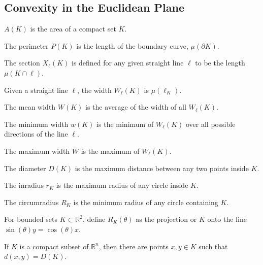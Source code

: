     \subsection{Convexity in the Euclidean Plane}
        \begin{definition}
        $A(K)$ is the area of a compact set $K$.
        \end{definition}
        \begin{definition}
        The perimeter $P(K)$ is the length of the boundary curve, $\mu(\partial K)$.
        \end{definition}
        \begin{definition}
        The section $X_{\ell}(K)$ is defined for any given straight line $\ell$ to be the length $\mu(K\cap \ell)$.
        \end{definition}
        \begin{definition}
        Given a straight line $\ell$, the width $W_{\ell}(K)$ is $\mu(\ell_{K})$.
        \end{definition}
        \begin{definition}
        The mean width $W(K)$ is the average of the width of all $W_{\ell}(K)$.
        \end{definition}
        \begin{definition}
        The minimum width $w(K)$ is the minimum of $W_{\ell}(K)$ over all possible directions of the line $\ell$.
        \end{definition}
        \begin{definition}
        The maximum width $\check{W}$ is the maximum of $W_{\ell}(K)$.
        \end{definition}
        \begin{definition}
        The diameter $D(K)$ is the maximum distance between any two points inside $K$.
        \end{definition}
        \begin{definition}
        The inradius $r_K$ is the maximum radius of any circle inside $K$.
        \end{definition}
        \begin{definition}
        The circumradius $R_K$ is the minimum radius of any circle containing $K$.
        \end{definition}
        For bounded sets $K\subset \mathbb{R}^2$, define $R_K(\theta)$ as the
        projection or $K$ onto the line $\sin(\theta)y=\cos(\theta)x$.
        \begin{theorem}
        If $K$ is a compact subset of $\mathbb{R}^n$, then there are points $x,y\in K$ such that $d(x,y)=D(K)$.
        \end{theorem}
